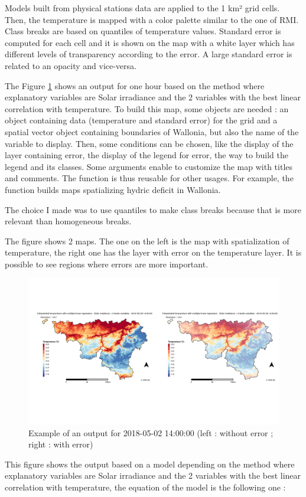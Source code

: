 \documentclass[12pt,twoside]{reedthesis}
\theoremstyle{definition}
\theoremstyle{definition}
\theoremstyle{definition}
\theoremstyle{remark}
\begin{document}
Models built from physical stations data are applied to the 1 km² grid
cells. Then, the temperature is mapped with a color palette similar to
the one of RMI. Class breaks are based on quantiles of temperature
values. Standard error is computed for each cell and it is shown on the
map with a white layer which has different levels of transparency
according to the error. A large standard error is related to an opacity
and vice-versa.

The Figure \ref{fig:map} shows an output for one hour based on the
method where explanatory variables are Solar irradiance and the 2
variables with the best linear correlation with temperature. To build
this map, some objects are needed : an object containing data
(temperature and standard error) for the grid and a spatial vector
object containing boundaries of Wallonia, but also the name of the
variable to display. Then, some conditions can be chosen, like the
display of the layer containing error, the display of the legend for
error, the way to build the legend and its classes. Some arguments
enable to customize the map with titles and comments. The function is
thus reusable for other usages. For example, the function builds maps
spatializing hydric deficit in Wallonia.

The choice I made was to use quantiles to make class breaks because that
is more relevant than homogeneous breaks.

The figure shows 2 maps. The one on the left is the map with
spatialization of temperature, the right one has the layer with error on
the temperature layer. It is possible to see regions where errors are
more important.
\begin{figure}
\includegraphics[width=1\linewidth]{figure/maperror} \caption{Example of an output for 2018-05-02 14:00:00 (left : without error ; right : with error)}\label{fig:map}
\end{figure}
This figure shows the output based on a model depending on the method
where explanatory variables are Solar irradiance and the 2 variables
with the best linear correlation with temperature, the equation of the
model is the following one :
\end{document}
